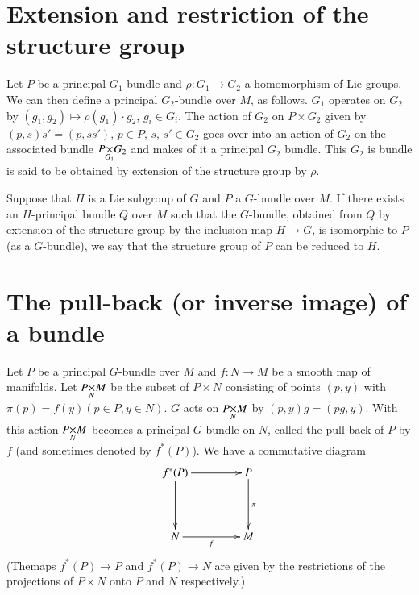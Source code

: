 \section*{Extension and restriction of the structure group}
\pageoriginale

Let $P$ be a principal $G_{1}$ bundle and $\rho:G_{1}\to G_{2}$ a homomorphism of Lie groups. We can then define a principal $G_{2}$-bundle over $M$, as follows. $G_{1}$ operates on $G_{2}$ by $(g_{1},g_{2})\mapsto \rho(g_{1})\cdot g_{2}$, $g_{i}\in G_{i}$. The action of $G_{2}$ on $P\times G_{2}$ given by $(p,s)s'=(p,ss')$, $p\in P$, $s$, $s'\in G_{2}$ goes over into an action of $G_{2}$ on the associated bundle $\fprod{P}{G_{2}}{G_{1}}$ and makes of it a principal $G_{2}$ bundle. This $G_{2}$ is bundle is said to be obtained by extension of the structure group by $\rho$.

Suppose that $H$ is a Lie subgroup of $G$ and $P$ a $G$-bundle over $M$. If there exists an $H$-principal bundle $Q$ over $M$ such that the $G$-bundle, obtained from $Q$ by extension of the structure group by the inclusion map $H\to G$, is isomorphic to $P$ (as a $G$-bundle), we say that the structure group of $P$ can be reduced to $H$.

\section*{The pull-back (or inverse image) of a bundle}

Let $P$ be a principal $G$-bundle over $M$ and $f:N\to M$ be a smooth map of manifolds. Let $\fprod{P}{M}{N}$ be the subset of $P\times N$ consisting of points $(p,y)$ with $\pi(p)=f(y)(p\in P,y\in N)$. $G$ acts on $\fprod{P}{M}{N}$ by $(p,y)g=(pg,y)$. With this action $\fprod{P}{M}{N}$ becomes a principal $G$-bundle on $N$, called the pull-back of $P$ by $f$ (and sometimes denoted by $f^{*}(P)$). We have a commutative diagram
\[
\xymatrix@=1.5cm{
f^{*}(P)\ar[r]\ar[d] & P\ar[d]^{\pi}\\
N\ar[r]_-{f} & M
}
\]
(The\pageoriginale maps $f^{*}(P)\to P$ and $f^{*}(P)\to N$ are given by the restrictions of the projections of $P\times N$ onto $P$ and $N$ respectively.)









